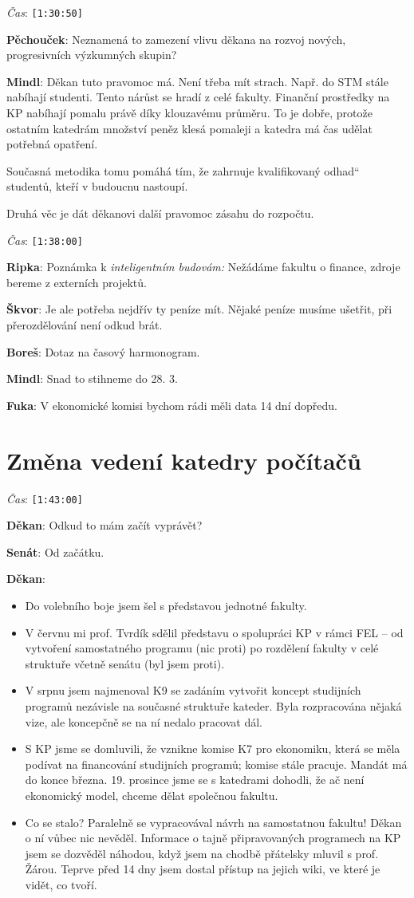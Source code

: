 \documentclass[a4paper,10pt,notitlepage]{article}
\newcommand{\ts}[1]{\texttt{[#1]}}
\newcommand{\tsp}[1]{\noindent \textit{Čas}: \ts{#1}}
\newcommand{\cl}[1]{\noindent \textbf{#1}:}
\newcommand\uv[1]{\quotedblbase #1\textquotedblleft}%
\begin{document}
\tsp{1:30:50}

\cl{Pěchouček} Neznamená to zamezení vlivu děkana na rozvoj nových, progresivních výzkumných skupin?

\cl{Mindl} Děkan tuto pravomoc má. Není třeba mít strach. Např. do STM stále nabíhají studenti. Tento nárůst se hradí z celé fakulty. Finanční prostředky na KP nabíhají pomalu právě díky klouzavému průměru. To je dobře, protože ostatním katedrám množství peněz klesá pomaleji a katedra má čas udělat potřebná opatření.

Současná metodika tomu pomáhá tím, že zahrnuje \uv{kvalifikovaný odhad} studentů, kteří v budoucnu nastoupí.

Druhá věc je dát děkanovi další pravomoc zásahu do rozpočtu.

\tsp{1:38:00}

\cl{Ripka} Poznámka k \textit{inteligentním budovám:} Nežádáme fakultu o finance, zdroje bereme z externích projektů.

\cl{Škvor} Je ale potřeba nejdřív ty peníze mít. Nějaké peníze musíme ušetřit, při přerozdělování není odkud brát.

\cl{Boreš} Dotaz na časový harmonogram.

\cl{Mindl} Snad to stihneme do 28. 3.

\cl{Fuka} V ekonomické komisi bychom rádi měli data 14 dní dopředu. 

\section{Změna vedení katedry počítačů}

\tsp{1:43:00}

\cl{Děkan} Odkud to mám začít vyprávět?

\cl{Senát} Od začátku.

\cl{Děkan}

\begin{itemize}
\item Do volebního boje jsem šel s představou jednotné fakulty.
\item V červnu mi prof. Tvrdík sdělil představu o spolupráci KP v rámci FEL -- od vytvoření samostatného programu (nic proti) po rozdělení fakulty v celé struktuře včetně senátu (byl jsem proti).
\item V srpnu jsem najmenoval K9 se zadáním vytvořit koncept studijních programů nezávisle na současné struktuře kateder. Byla rozpracována nějaká vize, ale koncepčně se na ní nedalo pracovat dál.
\item S KP jsme se domluvili, že vznikne komise K7 pro ekonomiku, která se měla podívat na financování studijních programů; komise stále pracuje. Mandát má do konce března. 19. prosince jsme se s katedrami dohodli, že ač není ekonomický model, chceme dělat společnou fakultu.
\item Co se stalo? Paralelně se vypracovával návrh na samostatnou fakultu! Děkan o ní vůbec nic nevěděl. Informace o tajně připravovaných programech na KP jsem se dozvěděl náhodou, když jsem na chodbě přátelsky mluvil s prof. Žárou. Teprve před 14 dny jsem dostal přístup na jejich wiki, ve které je vidět, co tvoří.
\end{itemize}
\end{document}
